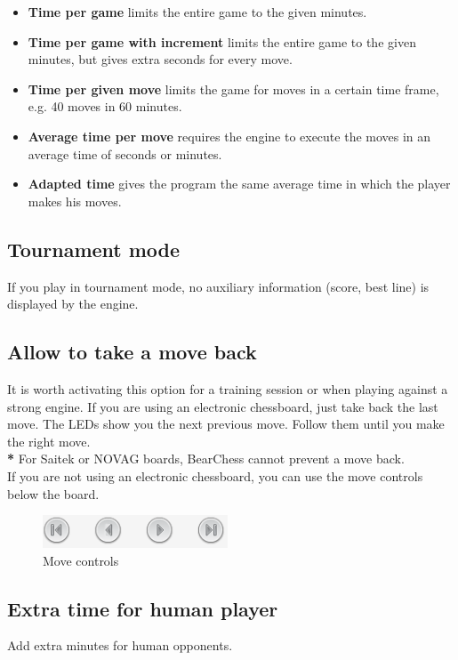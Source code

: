 \documentclass[11pt,a4paper]{article}
\begin{document}
\begin{itemize}
	\item \textbf{Time per game} limits the entire game to the given minutes.
	\item \textbf{Time per game with increment} limits the entire game to the given minutes, but gives extra seconds for every move.
	\item \textbf{Time per given move} limits the game for moves in a certain time frame, e.g. 40 moves in 60 minutes.
	\item \textbf{Average time per move} requires the engine to execute the moves in an average time of seconds or minutes.
	\item \textbf{Adapted time} gives the program the same average time in which the player makes his moves.	
\end{itemize}


\subsection{Tournament mode}
If you play in tournament mode, no auxiliary information (score, best line) is displayed by the engine.

\subsection{Allow to take a move back}
It is worth activating this option for a training session or when playing against a strong engine. If you are using an electronic chessboard, just take back the last move. The LEDs show you the next previous move. Follow them until you make the right move.\\
{\color{red}\textbf{*}} For Saitek or NOVAG boards, BearChess cannot prevent a move back.\\
If you are not using an electronic chessboard, you can use the move controls below the board.

\begin{figure}[H]
	\centering
	\includegraphics[scale=1.0]{MoveControl.png}
	\caption{Move controls}
	\label{fig:MoveControl}
\end{figure}


\subsection{Extra time for human player}
Add extra minutes for human opponents.
\end{document}
